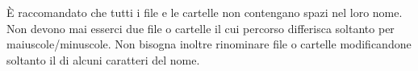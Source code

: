 È raccomandato che tutti i file e le cartelle non contengano spazi nel loro nome. Non devono mai esserci due file o cartelle il cui percorso differisca soltanto per maiuscole/minuscole. Non bisogna inoltre rinominare file o cartelle modificandone soltanto il  di alcuni caratteri del nome.
